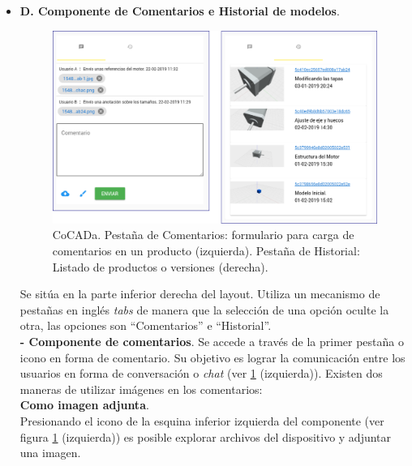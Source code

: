 \begin{itemize}
\item \textbf{D. Componente de Comentarios e Historial de modelos}.

\begin{figure}[ht]
    \includegraphics[width=14cm]{Img/Desarrollo/comentario00.png}
    \centering
    \caption{\footnotesize{CoCADa. Pestaña de Comentarios: formulario para carga de comentarios en un producto (izquierda). Pestaña de Historial: Listado de productos o versiones (derecha).}}
    \label{fig:comment0}
\end{figure}

\begin{itemize}
 Se sitúa en la parte inferior  derecha del layout. Utiliza un mecanismo de pestañas en inglés \textit{tabs} de manera que la selección de una opción oculte la otra, las opciones son ``Comentarios'' e ``Historial''.\\
 


 \textbf{- Componente de comentarios}. 
 Se accede a través de la primer pestaña o icono en forma de comentario. Su objetivo es lograr la comunicación entre los usuarios en forma de conversación o \textit{chat} (ver \ref{fig:comment0} (izquierda)).
 Existen dos maneras de utilizar imágenes en los comentarios:\\
 

\textbf{Como imagen adjunta}. \\
Presionando el icono de la esquina inferior izquierda del componente (ver figura \ref{fig:comment0} (izquierda)) es posible explorar archivos del dispositivo y adjuntar una imagen. 


\end{itemize}
\end{itemize}
